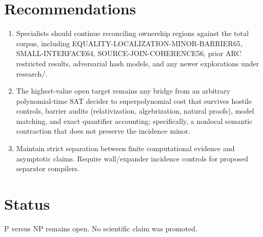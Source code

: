 \documentclass[11pt]{article}
\begin{document}
\section{Recommendations}
\begin{enumerate}
\item Specialists should continue reconciling ownership regions against the total corpus, including EQUALITY-LOCALIZATION-MINOR-BARRIER65, SMALL-INTERFACE64, SOURCE-JOIN-COHERENCE56, prior ARC restricted results, adversarial hash models, and any newer explorations under research/.
\item The highest-value open target remains any bridge from an arbitrary polynomial-time SAT decider to superpolynomial cost that survives hostile controls, barrier audits (relativization, algebrization, natural proofs), model matching, and exact quantifier accounting; specifically, a nonlocal semantic contraction that does not preserve the incidence minor.
\item Maintain strict separation between finite computational evidence and asymptotic claims. Require wall/expander incidence controls for proposed separator compilers.
\end{enumerate}

\section{Status}
P versus NP remains open. No scientific claim was promoted.

\end{document}

